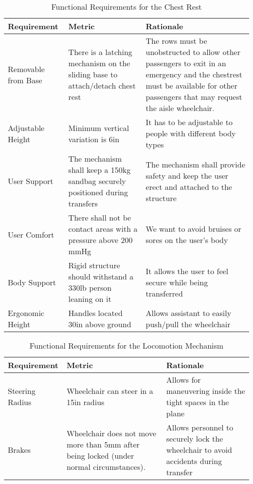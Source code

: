 \begin{table}
\begin{tabular} {| p{4cm} | p{5cm} | p{5cm} |}
\hline
\textbf{Requirement} & \textbf{Metric} & \textbf{Rationale} \\ \hline

Removable from Base &  There is a latching mechanism on the sliding base to attach/detach chest rest & The rows must be unobstructed to allow other passengers to exit in an emergency and the chestrest must be available for other passengers that may request the aisle wheelchair. \\ \hline
Adjustable Height & Minimum vertical variation is 6in & It has to be adjustable to people with different body types\\ \hline
User Support &   The mechanism shall keep a 150kg sandbag securely positioned during transfers & The mechanism shall provide safety and keep the user erect and attached to the structure \\ \hline
User Comfort & There shall not be contact areas with a pressure above 200 mmHg & We want to avoid bruises or sores on the user's  body \\ \hline
Body Support & Rigid structure should withstand a 330lb person leaning on it & It allows the user to feel secure while being transferred
\\ \hline
Ergonomic Height & Handles located 30in above ground & Allows assistant to easily push/pull the wheelchair \\ \hline
\end{tabular} 
\caption{Functional Requirements for the Chest Rest}
\label{tab:functional_requirements_chestrest}
\end{table}


\begin{table}
\begin{tabular} {| p{4cm} | p{5cm} | p{5cm} |}
\hline
\textbf{Requirement} & \textbf{Metric} & \textbf{Rationale} \\ \hline


Steering Radius &  Wheelchair can steer in a 15in radius & Allows for maneuvering inside the tight spaces in the plane \\ \hline
Brakes & Wheelchair does not move more than 5mm after being locked (under normal circumstances). & Allows personnel to securely lock the wheelchair to avoid accidents during transfer  \\ \hline
\end{tabular} 
\caption{Functional Requirements for the Locomotion Mechanism}
\label{tab:functional_requirements_locomotion}
\end{table}

